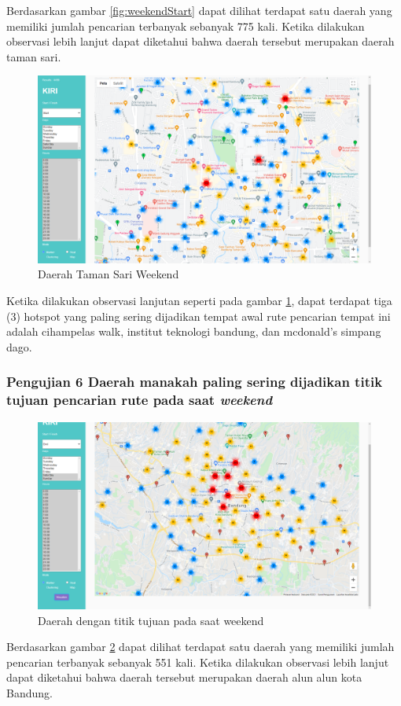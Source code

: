 Berdasarkan gambar \ref{fig:weekendStart} dapat dilihat terdapat satu daerah yang memiliki jumlah pencarian terbanyak sebanyak 775 kali. Ketika dilakukan observasi lebih lanjut dapat diketahui bahwa daerah tersebut merupakan daerah taman sari.

\begin{figure}[H]
	\centering  
	\includegraphics[scale=0.3]{Gambar/pengujian/weekend-taman-sari-zoomed.png}  
	\caption[Daerah Taman Sari Weekend ]{Daerah Taman Sari Weekend } 
	\label{fig:weekendStartZoom}
\end{figure}

Ketika dilakukan observasi lanjutan seperti pada gambar \ref{fig:weekendStartZoom}, dapat terdapat tiga (3) hotspot yang paling sering dijadikan tempat awal rute pencarian tempat ini adalah cihampelas walk, institut teknologi bandung, dan mcdonald's simpang dago.


\subsubsection{Pengujian 6 Daerah manakah  paling sering dijadikan titik tujuan pencarian rute pada saat \textit{weekend}}
\label{subsec:pengujian6}

\begin{figure}[H]
	\centering  
	\includegraphics[scale=0.3]{Gambar/pengujian/weekend-end.png}  
	\caption[Daerah dengan titik tujuan pada saat weekend]{Daerah dengan titik tujuan pada saat weekend } 
	\label{fig:weekendEnd}
\end{figure}
Berdasarkan gambar \ref{fig:weekendEnd} dapat dilihat terdapat satu daerah yang memiliki jumlah pencarian terbanyak sebanyak 551 kali. Ketika dilakukan observasi lebih lanjut dapat diketahui bahwa daerah tersebut merupakan daerah alun alun kota Bandung.

